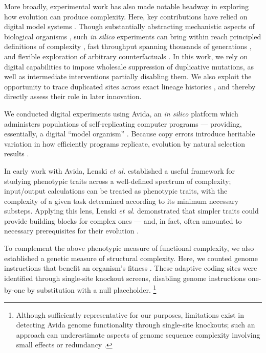 More broadly, experimental work has also made notable headway in exploring how evolution can produce complexity.
Here, key contributions have relied on digital model systems \citep{Fortuna2022,Adami2000Evolution,Zaman2014Coevolution,Fortuna2017GenotypePhenotype}.
Though substantially abstracting mechanistic aspects of biological organisms \citep{peck2004simulation}, such \textit{in silico} experiments can bring within reach principled definitions of complexity \citep{Adami2002}, fast throughput spanning thousands of generations \citep{moreno2024trackable}, and flexible exploration of arbitrary counterfactuals \citep{langton1989artificial}.
In this work, we rely on digital capabilities to impose wholesale suppression of duplicative mutations, as well as intermediate interventions partially disabling them.
We also exploit the opportunity to trace duplicated sites across exact lineage histories \citep{dolson2024phylotrack}, and thereby directly assess their role in later innovation.



We conducted digital experiments using Avida, an \textit{in silico} platform which administers populations of self-replicating computer programs --- providing, essentially, a digital ``model organism'' \citep{Ofria:2009avida}.
Because copy errors introduce heritable variation in how efficiently programs replicate, evolution by natural selection results \citep{pennock2007models}.

In early work with Avida, Lenski \textit{et al.} established a useful framework for studying phenotypic traits across a well-defined spectrum of complexity;
input/output calculations can be treated as phenotypic traits, with the complexity of a given task determined according to its minimum necessary substeps.
Applying this lens, Lenski \textit{et al.} demonstrated that simpler traits could provide building blocks for complex ones --- and, in fact, often amounted to necessary prerequisites for their evolution \citep{Lenski2003Evolutionary}.

To complement the above phenotypic measure of functional complexity, we also established a genetic measure of structural complexity.
Here, we counted genome instructions that benefit an organism's fitness \citep{Adami2002}.
These adaptive coding sites were identified through single-site knockout screens, disabling genome instructions one-by-one by substitution with a null placeholder.
\unskip\footnote{%
Although sufficiently representative for our purposes, limitations exist in detecting Avida genome functionality through single-site knockouts; such an approach can underestimate aspects of genome sequence complexity involving small effects or redundancy \citep{Lenski1999,moreno2024cryptic}.
}

